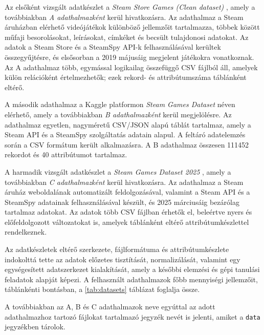 Az elsőként vizsgált adatkészlet a
\textit{Steam Store Games (Clean dataset)} \cite{a},
amely a továbbiakban \textit{A adathalmazként} kerül hivatkozásra.
Az adathalmaz a Steam áruházban elérhető videójátékok különböző jellemzőit
tartalmazza, többek között műfaji besorolásokat, leírásokat, címkéket és
becsült tulajdonosi adatokat.
Az adatok a Steam Store és a SteamSpy \cite{steamspy} API-k felhasználásával
kerültek összegyűjtésre, és elsősorban a 2019 májusáig megjelent játékokra
vonatkoznak.
Az A adathalmaz több, egymással logikailag összefüggő CSV fájlból áll,
amelyek külön relációként értelmezhetők; ezek rekord- és attribútumszáma
táblánként eltérő.

A második adathalmaz a Kaggle platformon
\textit{Steam Games Dataset} \cite{b} néven elérhető,
amely a továbbiakban \textit{B adathalmazként} kerül megjelölésre.
Az adathalmaz egyetlen, nagyméretű CSV/JSON alapú táblát tartalmaz,
amely a Steam API és a SteamSpy szolgáltatás adatain alapul.
A feltáró adatelemzés során a CSV formátum került alkalmazásra.
A B adathalmaz összesen \num{111452} rekordot és 40 attribútumot tartalmaz.

A harmadik vizsgált adatkészlet a
\textit{Steam Games Dataset 2025} \cite{c},
amely a továbbiakban \textit{C adathalmazként} kerül hivatkozásra.
Az adathalmaz a Steam áruház weboldalának automatizált feldolgozásával,
valamint a Steam API és a SteamSpy adatainak felhasználásával készült,
és 2025 márciusáig bezárólag tartalmaz adatokat.
Az adatok több CSV fájlban érhetők el, beleértve nyers és előfeldolgozott
változatokat is, amelyek táblánként eltérő attribútumkészlettel rendelkeznek.

Az adatkészletek eltérő szerkezete, fájlformátuma és attribútumkészlete
indokolttá tette az adatok előzetes tisztítását, normalizálását,
valamint egy egységesített adatszerkezet kialakítását,
amely a későbbi elemzési és gépi tanulási feladatok alapját képezi.
A felhasznált adathalmazok főbb mennyiségi jellemzőit,
táblánkénti bontásban, a \ref{tab:datasets} táblázat foglalja össze.

A továbbiakban az A, B és C adathalmazok neve egyúttal az adott adathalmazhoz tartozó fájlokat tartalmazó jegyzék nevét is jelenti, amiket a \texttt{data} jegyzékben tárolok.

